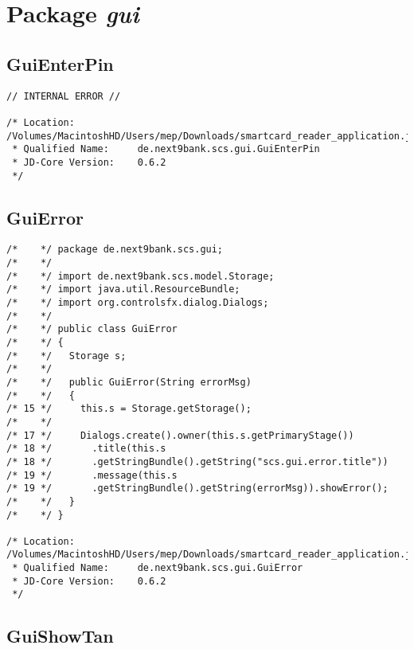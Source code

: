 \section{Package \textit{gui}}

\subsection{GuiEnterPin}

\begin{lstlisting}
// INTERNAL ERROR //

/* Location:           /Volumes/MacintoshHD/Users/mep/Downloads/smartcard_reader_application.jar
 * Qualified Name:     de.next9bank.scs.gui.GuiEnterPin
 * JD-Core Version:    0.6.2
 */
\end{lstlisting}

\subsection{GuiError}

\begin{lstlisting}
/*    */ package de.next9bank.scs.gui;
/*    */ 
/*    */ import de.next9bank.scs.model.Storage;
/*    */ import java.util.ResourceBundle;
/*    */ import org.controlsfx.dialog.Dialogs;
/*    */ 
/*    */ public class GuiError
/*    */ {
/*    */   Storage s;
/*    */ 
/*    */   public GuiError(String errorMsg)
/*    */   {
/* 15 */     this.s = Storage.getStorage();
/*    */ 
/* 17 */     Dialogs.create().owner(this.s.getPrimaryStage())
/* 18 */       .title(this.s
/* 18 */       .getStringBundle().getString("scs.gui.error.title"))
/* 19 */       .message(this.s
/* 19 */       .getStringBundle().getString(errorMsg)).showError();
/*    */   }
/*    */ }

/* Location:           /Volumes/MacintoshHD/Users/mep/Downloads/smartcard_reader_application.jar
 * Qualified Name:     de.next9bank.scs.gui.GuiError
 * JD-Core Version:    0.6.2
 */
\end{lstlisting}

\subsection{GuiShowTan}


